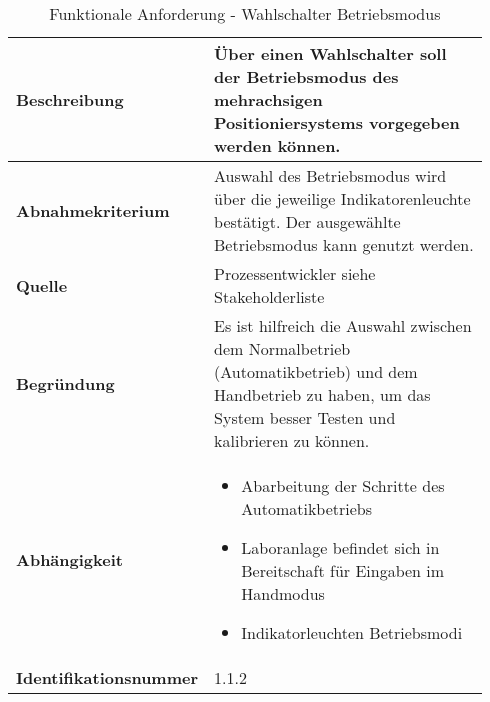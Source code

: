 \documentclass[../../../Bachelorarbeit.tex]{subfiles}
\begin{document}
\begin{table}[H]
    \centering
    \begin{tabular}{| p{0.34\linewidth} | p{0.6\linewidth} |}
        \hline
        \textbf{Beschreibung} & Über einen Wahlschalter soll der Betriebsmodus des mehrachsigen Positioniersystems vorgegeben werden können. \\ \hline
        \textbf{Abnahmekriterium} & Auswahl des Betriebsmodus wird über die jeweilige Indikatorenleuchte bestätigt. Der ausgewählte Betriebsmodus kann genutzt werden. \\ \hline
        \textbf{Quelle} & Prozessentwickler siehe Stakeholderliste \\ \hline
        \textbf{Begründung} & Es ist hilfreich die Auswahl zwischen dem Normalbetrieb (Automatikbetrieb) und dem Handbetrieb zu haben, um das System besser Testen und kalibrieren zu können. \\ \hline
        \textbf{Abhängigkeit} & {\begin{itemize}[noitemsep,topsep=0pt,parsep=0pt,partopsep=0pt,leftmargin=*]
            \item Abarbeitung der Schritte des Automatikbetriebs
            \item Laboranlage befindet sich in Bereitschaft für Eingaben im Handmodus
            \item Indikatorleuchten Betriebsmodi
        \end{itemize}} \\ \hline
        \textbf{Identifikationsnummer} & 1.1.2 \\ \hline
    \end{tabular}
    \caption[\acs{fa} - Wahlschalter Betriebsmodus]{Funktionale Anforderung - Wahlschalter Betriebsmodus}
    \label{tab:my-table2}
\end{table}
\end{document}
